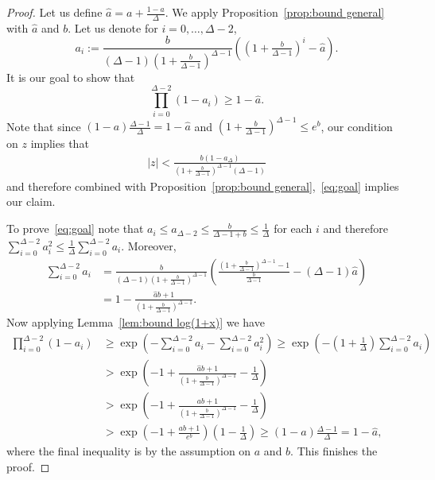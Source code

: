 \documentclass[a4paper,11pt,reqno]{amsart}
\numberwithin{equation}{section}
\begin{document}
\begin{proof}
Let us define $\hat{a}=a+\tfrac{1-a}{\Delta}$. 
We apply Proposition~\ref{prop:bound general} with $\hat{a}$ and $b$.
Let us denote 
for $i=0,\ldots,\Delta-2$, 
\[
a_i:=\frac{b}{(\Delta-1) \left(1+\tfrac{b}{\Delta-1}\right)^{\Delta-1}}\left((1+\tfrac{b}{\Delta-1})^{i}-\hat{a}\right).
\]
It is our goal to show that 
\begin{equation}\label{eq:goal}
\prod_{i=0}^{\Delta-2}(1-a_i)\geq 1-\hat{a}.
\end{equation}
Note that since $(1-a)\tfrac{\Delta-1}{\Delta}=1-\hat{a}$ and $\left(1+\tfrac{b}{\Delta-1}\right)^{\Delta-1}\leq e^b$, our condition on $z$ implies that 
\begin{align*}
|z|<\frac{b(1-a_\Delta)}{(1+\tfrac{b}{\Delta-1})^{\Delta-1}(\Delta-1)}
\end{align*}
and therefore combined with Proposition~\ref{prop:bound general},~\eqref{eq:goal} implies our claim.

To prove~\eqref{eq:goal} note that $a_i\leq a_{\Delta-2}\leq \tfrac{b}{\Delta-1+b}\leq \tfrac{1}{\Delta}$ for each $i$ and therefore $\sum_{i=0}^{\Delta-2}a_i^2\leq  \tfrac{1}{\Delta}\sum_{i=0}^{\Delta-2}a_i$.
Moreover,
\begin{align*}
    \sum_{i=0}^{\Delta-2}a_i&=\frac{b}{(\Delta-1)\left(1+\tfrac{b}{\Delta-1}\right)^{\Delta-1}} \left(\frac{\left(1+\tfrac{b}{\Delta-1}\right)^{\Delta-1}-1}{\tfrac{b}{\Delta-1}}-(\Delta-1)\hat{a} \right)
    \\
    &=1-\frac{\hat{a} b+1}{\left(1+\tfrac{b}{\Delta-1}\right)^{\Delta-1}}.
    \end{align*}
Now applying Lemma~\ref{lem:bound log(1+x)} we have
\begin{align*}
    \prod_{i=0}^{\Delta-2}(1-a_i)&\geq \exp\left(-\sum_{i=0}^{\Delta-2}a_i -\sum_{i=0}^{\Delta-2}a_i^2\right)\geq \exp\left(-(1+\tfrac{1}{\Delta})\sum_{i=0}^{\Delta-2}a_i\right)
    \\
    &> \exp\left (-1+\frac{\hat{a} b+1}{\left(1+\tfrac{b}{\Delta-1}\right)^{\Delta-1}}-\frac{1}{\Delta}\right)
    \\
    &>\exp\left (-1+\frac{ab+1}{\left(1+\tfrac{b}{\Delta-1}\right)^{\Delta-1}}-\frac{1}{\Delta}\right)
    \\
    &>\exp\left (-1+\frac{ab+1}{e^b}\right)\left(1-\frac{1}{\Delta}\right)\geq (1-a)\frac{\Delta-1}{\Delta}=1-\hat{a},
\end{align*}
where the final inequality is by the assumption on $a$ and $b$. This finishes the proof.
\end{proof}
\end{document}
